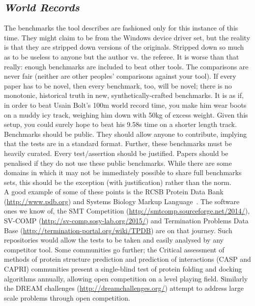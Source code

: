 \documentclass[a4paper,11pt]{article}
\begin{document}
\subsection{{\emph{World Records}}}

The benchmarks the tool describes are fashioned only for this instance
of this time. They might claim to be from the Windows device driver
set, but the reality is that they are stripped down versions of the
originals. Stripped down so much as to be useless to anyone but the
author vs. the referee. It is worse than that really: enough
benchmarks are included to beat other tools. The comparisons are never
fair (neither are other peoples' comparisons against your tool). If
every paper has to be novel, then every benchmark, too, will be novel;
there is no monotonic, historical truth in new, synthetically-crafted
benchmarks. It is as if, in order to beat Usain Bolt's
\num{100}\si{\metre} world record time, you make him wear boots on a
muddy icy track, weighing him down with \num{50}\si{\kilogram} of
excess weight. Given this setup, you could surely hope to beat his
\num{9.58}\si{\second} time on a shorter length track.\\

 Benchmarks should
be public. They should allow anyone to contribute, implying that the
tests are in a standard format. Further, these benchmarks must be
heavily curated. Every test/assertion should be justified. Papers
should be penalised if they do not use these public benchmarks. While
there are some domains in which it may not be immediately possible to
share full benchmarks sets, this should be the exception (with
justification) rather than the norm.\\

A good example of some of these points is the RCSB Protein Data
Bank (\url{http://www.pdb.org}) and Systems Biology Markup
Language~\cite{Chaouiya2013}. The software ones we know of,
the SMT
Competition (\url{http://smtcomp.sourceforge.net/2014/}),
SV-COMP (\url{http://sv-comp.sosy-lab.org/2015/}) and
Termination Problems Data
Base (\url{http://termination-portal.org/wiki/TPDB}) are on
that journey. Such repositories would allow the tests to be taken and
easily analysed by any competitor tool. Some communities go further;
the Critical assessment of methods of protein structure prediction
and prediction of interactions (CASP and CAPRI)\cite{Moult2015,Lensink2017} communities present 
a single-blind test of protein folding and docking
algorithms annually, allowing open competition on a level playing 
field. Similarly the DREAM challenges (\url{http://dreamchallenges.org/}) 
attempt to address large scale problems through open competition.
\end{document}
